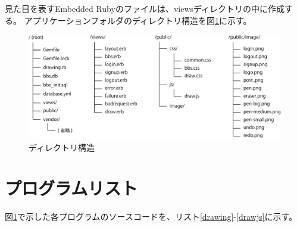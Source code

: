 \documentclass[a4j,titlepage]{jsarticle}
\begin{document}
見た目を表すEmbedded Rubyのファイルは、viewsディレクトリの中に作成する。
アプリケーションフォルダのディレクトリ構造を図\ref{dir}に示す。

\begin{figure}[H]
\centering
\includegraphics[width=14cm]{file.pdf}
\caption{ディレクトリ構造}
\label{dir}
\end{figure}


\section{プログラムリスト}
図\ref{dir}で示した各プログラムのソースコードを、リスト\ref{drawing}-\ref{drawjs}に示す。






















\end{document}
